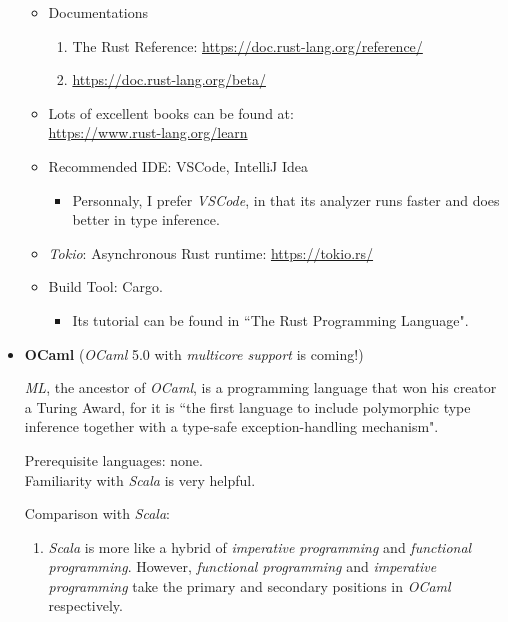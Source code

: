 \documentclass{article}
\begin{document}
\begin{itemize}
\begin{itemize}
\begin{enumerate}
        \end{enumerate}
        \item Documentations
        \begin{enumerate}
            \item The Rust Reference:
            \href{https://doc.rust-lang.org/reference/}{https://doc.rust-lang.org/reference/}
            \item \href{https://doc.rust-lang.org/beta/}{https://doc.rust-lang.org/beta/}
        \end{enumerate}
        \item Lots of excellent books can be found at:\\
        \href{https://www.rust-lang.org/learn}{https://www.rust-lang.org/learn}
        \item Recommended IDE: VSCode, IntelliJ Idea
        \begin{itemize}
            \item Personnaly, I prefer \emph{VSCode}, in that its analyzer runs faster and does better in type inference.
        \end{itemize}
        \item \emph{Tokio}: Asynchronous Rust runtime:
        \href{https://tokio.rs/}{https://tokio.rs/}
        \item Build Tool: Cargo.
        \begin{itemize}
            \item Its tutorial can be found in ``The Rust Programming Language".
        \end{itemize}
    \end{itemize}

    \item \textbf{OCaml} (\emph{OCaml} 5.0 with \emph{multicore support} is coming!)
    
    \emph{ML}, the ancestor of \emph{OCaml}, is a programming language that won his creator a Turing Award, for it is ``the first language to include polymorphic type inference together with a type-safe exception-handling mechanism".
    
    Prerequisite languages: none.\\
    Familiarity with \emph{Scala} is very helpful.
    
    Comparison with \emph{Scala}:
    \begin{enumerate}
        \item \emph{Scala} is more like a hybrid of \emph{imperative programming} and \emph{functional programming}.
        However, \emph{functional programming} and \emph{imperative programming} take the primary and secondary positions in \emph{OCaml} respectively.
        

\end{enumerate}
\end{itemize}
\end{document}
